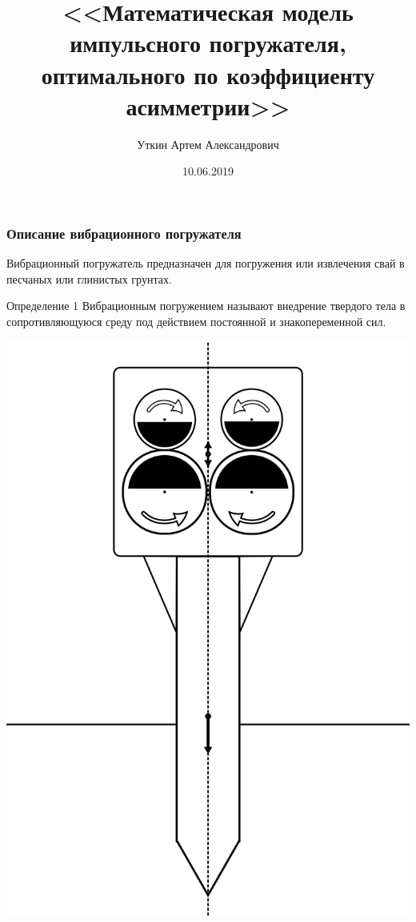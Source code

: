 \documentclass[10pt, pdf, hyperref={unicode}]{beamer}
\title{<<Математическая модель импульсного погружателя, оптимального по коэффициенту асимметрии>>}
\date{10.06.2019}
\author{Уткин Артем Александрович}
\begin{document}
    
    \begin{frame} %
        \titlepage
    \end{frame}


    \begin{frame}
                \begin{minipage}[h]{0.5\linewidth}
                    \frametitle{Описание вибрационного погружателя}
                    Вибрационный погружатель предназначен для погружения или извлечения свай в песчаных или глинистых грунтах.
                    \begin{block}{Определение 1}
                        Вибрационным погружением называют внедрение твердого тела в сопротивляющуюся среду под действием постоянной и знакопеременной сил.
                    \end{block}
                \end{minipage}
                \hfill 
                \begin{minipage}[h]{0.4\linewidth}
                        \includegraphics[width=1\linewidth]{img/scheme_porg.png}

\end{minipage}
\end{frame}
\end{document}
